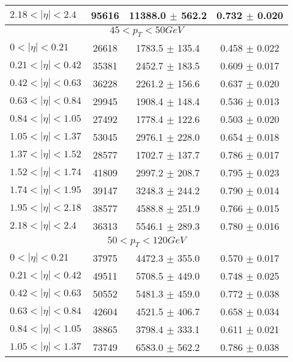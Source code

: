 \begin{tabular}{lccc}
$2.18 < |\eta| <2.4$           & 95616      & 11388.0    $\pm$ 562.2 & 0.732      $\pm$ 0.020 \\
\hline
\multicolumn{4}{c}{$45 < p_{T} < 50 GeV$} \\
\hline
$0 < |\eta| <0.21$             & 26618      & 1783.5     $\pm$ 135.4 & 0.458      $\pm$ 0.022 \\
$0.21 < |\eta| <0.42$          & 35381      & 2452.7     $\pm$ 183.5 & 0.609      $\pm$ 0.017 \\
$0.42 < |\eta| <0.63$          & 36228      & 2261.2     $\pm$ 156.6 & 0.637      $\pm$ 0.020 \\
$0.63 < |\eta| <0.84$          & 29945      & 1908.4     $\pm$ 148.4 & 0.536      $\pm$ 0.013 \\
$0.84 < |\eta| <1.05$          & 27492      & 1778.4     $\pm$ 122.6 & 0.503      $\pm$ 0.020 \\
$1.05 < |\eta| <1.37$          & 53045      & 2976.1     $\pm$ 228.0 & 0.654      $\pm$ 0.018 \\
$1.37 < |\eta| <1.52$          & 28577      & 1702.7     $\pm$ 137.7 & 0.786      $\pm$ 0.017 \\
$1.52 < |\eta| <1.74$          & 41809      & 2997.2     $\pm$ 208.7 & 0.795      $\pm$ 0.023 \\
$1.74 < |\eta| <1.95$          & 39147      & 3248.3     $\pm$ 244.2 & 0.790      $\pm$ 0.014 \\
$1.95 < |\eta| <2.18$          & 38577      & 4588.8     $\pm$ 251.9 & 0.766      $\pm$ 0.015 \\
$2.18 < |\eta| <2.4$           & 36313      & 5546.1     $\pm$ 289.3 & 0.780      $\pm$ 0.016 \\
\hline
\multicolumn{4}{c}{$50 < p_{T} < 120 GeV$} \\
\hline
$0 < |\eta| <0.21$             & 37975      & 4472.3     $\pm$ 355.0 & 0.570      $\pm$ 0.017 \\
$0.21 < |\eta| <0.42$          & 49511      & 5708.5     $\pm$ 449.0 & 0.748      $\pm$ 0.025 \\
$0.42 < |\eta| <0.63$          & 50552      & 5481.3     $\pm$ 459.0 & 0.772      $\pm$ 0.038 \\
$0.63 < |\eta| <0.84$          & 42604      & 4521.5     $\pm$ 406.7 & 0.658      $\pm$ 0.034 \\
$0.84 < |\eta| <1.05$          & 38865      & 3798.4     $\pm$ 333.1 & 0.611      $\pm$ 0.021 \\
$1.05 < |\eta| <1.37$          & 73749      & 6583.0     $\pm$ 562.2 & 0.786      $\pm$ 0.038 \\

\end{tabular}
